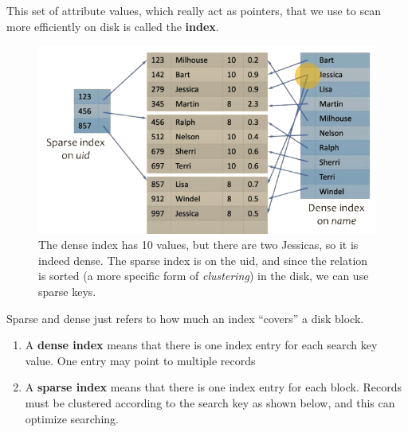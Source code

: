   \begin{definition}[Index]
    This set of attribute values, which really act as pointers, that we use to scan more efficiently on disk is called the \textbf{index}. 

    \begin{figure}[H]
      \centering 
      \includegraphics[scale=0.4]{img/dense_sparse.png}
      \caption{The dense index has 10 values, but there are two Jessicas, so it is indeed dense. The sparse index is on the uid, and since the relation is sorted (a more specific form of \textit{clustering}) in the disk, we can use sparse keys.} 
      \label{fig:dense_sparse}
    \end{figure}

    Sparse and dense just refers to how much an index ``covers'' a disk block. 
    \begin{enumerate}
      \item A \textbf{dense index} means that there is one index entry for each search key value. One entry may point to multiple records
      \item A \textbf{sparse index} means that there is one index entry for each block. Records must be clustered according to the search key as shown below, and this can optimize searching. 
    \end{enumerate}


\end{definition}
